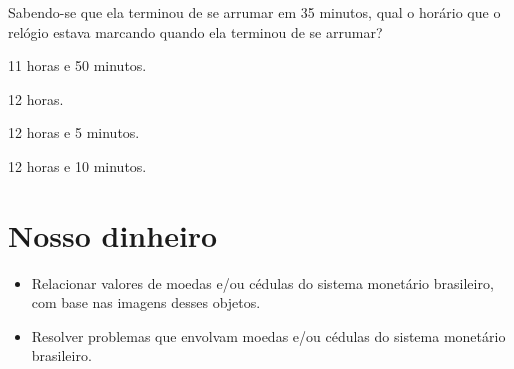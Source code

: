 Sabendo-se que ela terminou de se arrumar em 35 minutos, qual o horário
que o relógio estava marcando quando ela terminou de se arrumar?

\begin{minipage}{.5\textwidth}
\begin{escolha}
\item
  11 horas e 50 minutos.
\item
  12 horas.
\item
  12 horas e 5 minutos.
\item
  12 horas e 10 minutos.
\end{escolha}
\end{minipage}

\chapter{Nosso dinheiro}


\begin{itemize}
\item Relacionar valores de moedas e/ou cédulas do sistema monetário
brasileiro, com base nas imagens desses objetos.

\item Resolver problemas que envolvam moedas e/ou cédulas do sistema
monetário brasileiro.
\end{itemize}

